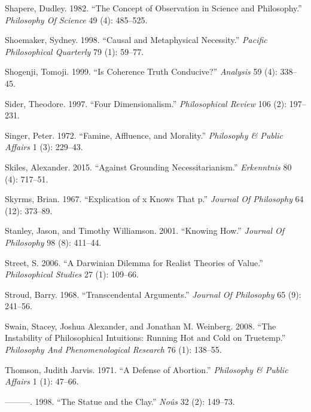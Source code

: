 \documentclass[
  10pt,
  letterpaper,
  DIV=11,
  numbers=noendperiod,
  twoside]{scrartcl}
\newlength{\cslhangindent}
\newenvironment{CSLReferences}[2] %
 {\begin{list}{}{%
  \setlength{\itemindent}{0pt}
  \setlength{\leftmargin}{0pt}
  \setlength{\parsep}{0pt}
  \ifodd #1
   \setlength{\leftmargin}{\cslhangindent}
   \setlength{\itemindent}{-1\cslhangindent}
  \fi
  \setlength{\itemsep}{#2\baselineskip}}}
 {\end{list}}
\begin{document}
\begin{CSLReferences}{1}{0}
Shapere, Dudley. 1982. {``The Concept of Observation in Science and
Philosophy.''} \emph{Philosophy Of Science} 49 (4): 485--525.

Shoemaker, Sydney. 1998. {``Causal and Metaphysical Necessity.''}
\emph{Pacific Philosophical Quarterly} 79 (1): 59--77.

Shogenji, Tomoji. 1999. {``Is Coherence Truth Conducive?''}
\emph{Analysis} 59 (4): 338--45.

Sider, Theodore. 1997. {``Four Dimensionalism.''} \emph{Philosophical
Review} 106 (2): 197--231.

Singer, Peter. 1972. {``Famine, Affluence, and Morality.''}
\emph{Philosophy \& Public Affairs} 1 (3): 229--43.

Skiles, Alexander. 2015. {``Against Grounding Necessitarianism.''}
\emph{Erkenntnis} 80 (4): 717--51.

Skyrms, Brian. 1967. {``Explication of x Knows That p.''} \emph{Journal
Of Philosophy} 64 (12): 373--89.

Stanley, Jason, and Timothy Williamson. 2001. {``Knowing How.''}
\emph{Journal Of Philosophy} 98 (8): 411--44.

Street, S. 2006. {``A Darwinian Dilemma for Realist Theories of
Value.''} \emph{Philosophical Studies} 27 (1): 109--66.

Stroud, Barry. 1968. {``Transcendental Arguments.''} \emph{Journal Of
Philosophy} 65 (9): 241--56.

Swain, Stacey, Joshua Alexander, and Jonathan M. Weinberg. 2008. {``The
Instability of Philosophical Intuitions: Running Hot and Cold on
Truetemp.''} \emph{Philosophy And Phenomenological Research} 76 (1):
138--55.

Thomson, Judith Jarvis. 1971. {``A Defense of Abortion.''}
\emph{Philosophy \& Public Affairs} 1 (1): 47--66.

---------. 1998. {``The Statue and the Clay.''} \emph{Noûs} 32 (2):
149--73.


\end{CSLReferences}
\end{document}
